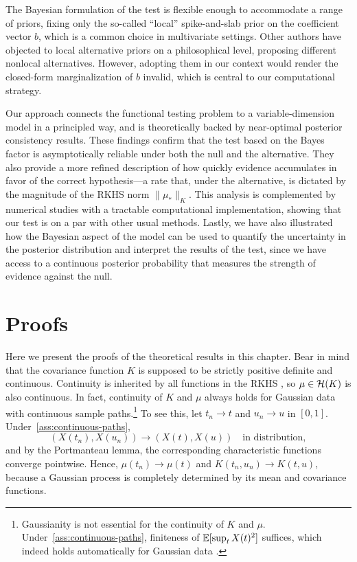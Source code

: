 The Bayesian formulation of the test is flexible enough to accommodate a range of priors, fixing only the so-called ``local'' spike-and-slab prior on the coefficient vector \(b\), which is a common choice in multivariate settings. Other authors \citep[e.g.][]{johnson2010use} have objected to local alternative priors on a philosophical level, proposing different nonlocal alternatives. However, adopting them in our context would render the closed-form marginalization of \(b\) invalid, which is central to our computational strategy. 

Our approach connects the functional testing problem to a variable-dimension model in a principled way, and is theoretically backed by near-optimal posterior consistency results. These findings confirm that the test based on the Bayes factor is asymptotically reliable under both the null and the alternative. They also provide a more refined description of how quickly evidence accumulates in favor of the correct hypothesis---a rate that, under the alternative, is dictated by the magnitude of the \acs{RKHS} norm \(\|\mu_*\|_K\). This analysis is complemented by numerical studies with a tractable computational implementation, showing that our test is on a par with other usual methods. Lastly, we have also illustrated how the Bayesian aspect of the model can be used to quantify the uncertainty in the posterior distribution and interpret the results of the test, since we have access to a continuous posterior probability that measures the strength of evidence against the null.

\section{Proofs}\label{sec:proofs-bft}

Here we present the proofs of the theoretical results in this chapter. Bear in mind that the covariance function \(K\) is supposed to be strictly positive definite and continuous. Continuity is inherited by all functions in the \acs{RKHS} \citep[Corollary~5]{berlinet2004reproducing}, so \(\mu\in\mathcal{H}(K)\) is also continuous. In fact, continuity of \(K\) and \(\mu\) always holds for Gaussian data with continuous sample paths.\footnote{Gaussianity is not essential for the continuity of \(K\) and \(\mu\). Under~\ref{ass:continuous-paths}, finiteness of \(\mathbb{E}[\sup_t X(t)^2]\) suffices, which indeed holds automatically for Gaussian data \citep{landau1970supremum}.} To see this, let \(t_n\to t\) and \(u_n \to u\) in \([0,1]\). Under~\ref{ass:continuous-paths},
\[
  (X(t_n), X(u_n))\to (X(t), X(u))\quad \text{in distribution},
\]
and by the Portmanteau lemma, the corresponding characteristic functions converge pointwise. Hence, \(\mu(t_n)\to \mu(t)\) and \(K(t_n, u_n) \to K(t,u)\), because a Gaussian process is completely determined by its mean and covariance functions.

